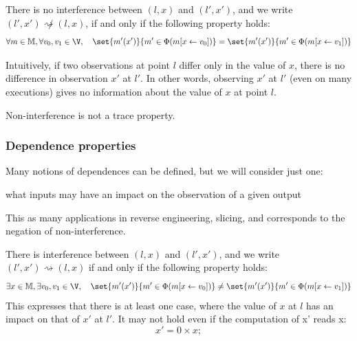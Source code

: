 \documentclass[toc, titlepaged]{../cs-classes/cs-classes}
\begin{document}
\begin{definition}
    There is no interference between $(l, x)$ and $(l', x')$, and we write $(l', x') \not\rightsquigarrow (l, x)$, if and only if the following property holds:
    \begin{equation*}
        \forall m\in\mathbb{M}, \forall v_0, v_1\in\V, \quad \set{m'(x')}{m'\in\Phi(m[x\leftarrow v_0])} = \set{m'(x')}{m'\in\Phi(m[x\leftarrow v_1])}
    \end{equation*}

    Intuitively, if two observations at point $l$ differ only in the value of $x$, there is no difference in observation $x'$ at $l'$. In other words, observing $x'$ at $l'$ (even on many executions) gives no information about the value of $x$ at point $l$.
\end{definition}

\begin{property}
    Non-interference is not a trace property.
\end{property}

\subsubsection{Dependence properties}
Many notions of dependences can be defined, but we will consider just one:
\begin{center}
    what inputs may have an impact on the observation of a given output
\end{center}
This as many applications in reverse engineering, slicing, and corresponds to the negation of non-interference.

\begin{definition}[Interference]
    There is interference between $(l, x)$ and $(l', x')$, and we write $(l', x')\rightsquigarrow(l, x)$ if and only if the following property holds:
    \begin{equation*}
        \exists x\in \mathbb{M}, \exists v_0, v_1\in\V, \quad \set{m'(x')}{m'\in\Phi(m[x\leftarrow v_0])} \neq \set{m'(x')}{m'\in\Phi(m[x\leftarrow v_1])}
    \end{equation*}
    This expresses that there is at least one case, where the value of $x$ at $l$ has an impact on that of $x'$ at $l'$. It may not hold even if the computation of x' reads x:
    \begin{equation*}
        x' = 0 \times x;
    \end{equation*}
\end{definition}
\end{document}
